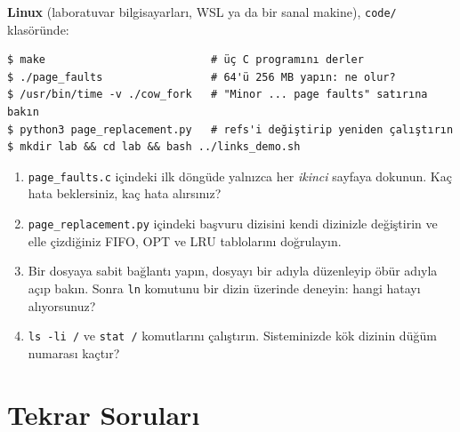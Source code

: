 \documentclass[11pt,a4paper]{article}
\newcommand{\cmd}[1]{\texttt{#1}}
\begin{document}
\begin{tryit}
\textbf{Linux} (laboratuvar bilgisayarları, WSL ya da bir sanal makine), \texttt{code/} klasöründe:
\begin{lstlisting}[style=term]
$ make                          # üç C programını derler
$ ./page_faults                 # 64'ü 256 MB yapın: ne olur?
$ /usr/bin/time -v ./cow_fork   # "Minor ... page faults" satırına bakın
$ python3 page_replacement.py   # refs'i değiştirip yeniden çalıştırın
$ mkdir lab && cd lab && bash ../links_demo.sh
\end{lstlisting}
\begin{enumerate}[leftmargin=1.4em]
  \item \cmd{page\_faults.c} içindeki ilk döngüde yalnızca her \emph{ikinci} sayfaya dokunun. Kaç hata beklersiniz, kaç hata alırsınız?
  \item \cmd{page\_replacement.py} içindeki başvuru dizisini kendi dizinizle değiştirin ve elle çizdiğiniz FIFO, OPT ve LRU tablolarını doğrulayın.
  \item Bir dosyaya sabit bağlantı yapın, dosyayı bir adıyla düzenleyip öbür adıyla açıp bakın. Sonra \cmd{ln} komutunu bir dizin üzerinde deneyin: hangi hatayı alıyorsunuz?
  \item \cmd{ls -li /} ve \cmd{stat /} komutlarını çalıştırın. Sisteminizde kök dizinin düğüm numarası kaçtır?
\end{enumerate}
\end{tryit}

\section{Tekrar Soruları}
\end{document}
